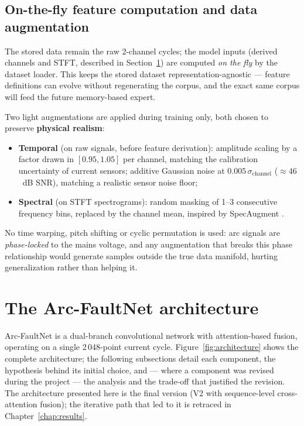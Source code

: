 \subsection{On-the-fly feature computation and data augmentation}
\label{sec:augmentation}

The stored data remain the raw 2-channel cycles; the model inputs (derived channels and STFT, described in Section~\ref{sec:architecture}) are computed \emph{on the fly} by the dataset loader. This keeps the stored dataset representation-agnostic --- feature definitions can evolve without regenerating the corpus, and the exact same corpus will feed the future memory-based expert.

\medskip

Two light augmentations are applied during training only, both chosen to preserve \textbf{physical realism}:

\begin{itemize}[itemsep=2pt]
    \item \textbf{Temporal} (on raw signals, before feature derivation): amplitude scaling by a factor drawn in $[0.95, 1.05]$ per channel, matching the calibration uncertainty of current sensors; additive Gaussian noise at $0.005\,\sigma_{\text{channel}}$ ($\approx 46$~dB SNR), matching a realistic sensor noise floor;
    \item \textbf{Spectral} (on STFT spectrograms): random masking of 1--3 consecutive frequency bins, replaced by the channel mean, inspired by SpecAugment \cite{park2019specaugment}.
\end{itemize}

No time warping, pitch shifting or cyclic permutation is used: arc signals are \emph{phase-locked} to the mains voltage, and any augmentation that breaks this phase relationship would generate samples outside the true data manifold, hurting generalization rather than helping it.

\section{The Arc-FaultNet architecture}
\label{sec:architecture}

Arc-FaultNet is a dual-branch convolutional network with attention-based fusion, operating on a single 2\,048-point current cycle. Figure~\ref{fig:architecture} shows the complete architecture; the following subsections detail each component, the hypothesis behind its initial choice, and --- where a component was revised during the project --- the analysis and the trade-off that justified the revision. The architecture presented here is the final version (V2 with sequence-level cross-attention fusion); the iterative path that led to it is retraced in Chapter~\ref{chap:results}.

